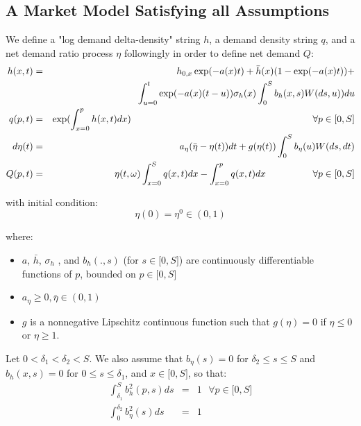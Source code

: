 \documentclass{article}
\begin{document}
\subsection{A Market Model Satisfying all Assumptions}

We define a "log demand delta-density" string $h$, a demand density string $q
$, and a net demand ratio process $\eta $ followingly in order to define net
demand $Q$:%
\begin{eqnarray}
h(x,t) &=&h_{0,x}\exp (-a(x)t)+\bar{h}(x)(1-\exp (-a(x)t))+  \label{equ_h_A}
\\
&&\int_{u=0}^{t}\exp (-a(x)(t-u))\sigma
_{h}(x)\int_{0}^{S}b_{h}(x,s)W(ds,u))du  \notag \\
q(p,t) &=&\exp ({\int_{x=0}^{p}h(x,t)dx)}\text{ \ \ \ \ \ \ \ \ \ \ \ \ \ \
\ \ \ \ \ \ \ \ \ \ \ \ \ \ \ \ \ \ \ \ \ \ \ \ \ \ \ \ \ \ \ \ \ \ \ \ \ \
\ \ \ }\forall p\in \lbrack 0,S]  \label{equ_q_A} \\
d\eta (t) &=&a_{\eta }(\bar{\eta}-\eta (t))dt+g(\eta (t))\int_{0}^{S}b_{\eta
}(u)W(ds,dt)  \label{equ_eta_A_bis} \\
Q(p,t) &=&\eta (t,\omega )\int_{x=0}^{S}q(x,t)dx-\int_{x=0}^{p}q(x,t)dx\text{
\ \ \ \ \ \ \ \ \ \ \ \ }\forall p\in \lbrack 0,S]  \label{equ_Q_A}
\end{eqnarray}

with initial condition:%
\begin{equation}
\eta (0)=\eta ^{0}\in (0,1)
\end{equation}

where:

\begin{itemize}
\item $a$, $\bar{h}$, $\sigma _{h}$ , and $b_{h}(.,s)$ (for $s\in \lbrack
0,S]$) are continuously differentiable functions of $p$, bounded on $p\in
\lbrack 0,S]$

\item $a_{\eta }\geq 0,\bar{\eta}\in (0,1)$

\item $g$ is a nonnegative Lipschitz continuous function such that $g(\eta
)=0$ if $\eta \leq 0$ or $\eta \geq 1$.
\end{itemize}

Let $0<\delta _{1}<\delta _{2}<S$. We also assume that $b_{\eta }(s)=0$ for $%
\delta _{2}\leq s\leq S$ and $b_{h}(x,s)=0$ for $0\leq s\leq \delta _{1}$,
and $x\in \lbrack 0,S]$, so that:%
\begin{eqnarray}
\int_{\delta _{1}}^{S}b_{h}^{2}(p,s)ds &=&1\text{\ \ \ \ \ \ \ }\forall p\in
\lbrack 0,S]  \label{bh} \\
\int_{0}^{\delta _{2}}b_{\eta }^{2}(s)ds &=&1  \label{b_eta}
\end{eqnarray}
\end{document}
